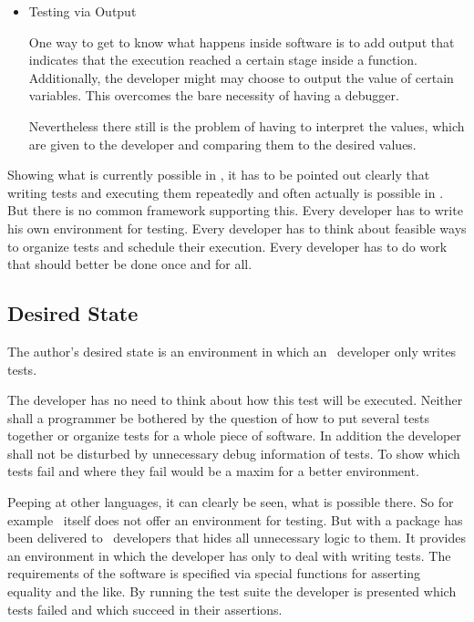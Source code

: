 \begin{itemize}
\item{Testing via Output}

One way to get to know what happens inside software is to add output that indicates that the execution reached a certain stage inside a function. Additionally, the developer might may choose to output the value of certain variables. This overcomes the bare necessity of having a debugger.

Nevertheless there still is the problem of having to interpret the values, which are given to the developer and comparing them to the desired values.

\end{itemize}

Showing what is currently possible in \Aldor, it has to be pointed out clearly that writing tests and executing them repeatedly and often actually is possible in \Aldor. But there is no common framework supporting this. Every developer has to write his own environment for testing. Every developer has to think about feasible ways to organize tests and schedule their execution. Every developer has to do work that should better be done once and for all.

\subsection{Desired State}

The author's desired state is an environment in which an \Aldor~developer only writes tests.

The developer has no need to think about how this test will be executed. Neither shall a programmer be bothered by the question of how to put several tests together or organize tests for a whole piece of software. In addition the developer shall not be disturbed by unnecessary debug information of tests. To show which tests fail and where they fail would be a maxim for a better \Aldor environment.

Peeping at other languages, it can clearly be seen, what is possible there. So for example \Java~itself does not offer an environment for testing. But with \JUnit\cite{JUnit} a package has been delivered to \Java~developers that hides all unnecessary logic to them. It provides an environment in which the developer has only to deal with writing tests. The requirements of the software is specified via special functions for asserting equality and the like. By running the test suite the developer is presented which tests failed and which succeed in their assertions.
